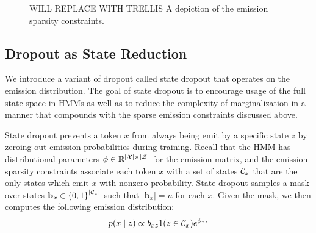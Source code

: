 \documentclass[11pt,a4paper]{article}
\begin{document}


\begin{figure}[t]
\begin{center}

\end{center}
\caption{
\label{fig:trellis}
{\color{red} WILL REPLACE WITH TRELLIS}
A depiction of the emission sparsity constraints.
}
\end{figure}

\subsection{Dropout as State Reduction}
We introduce a variant of dropout called state dropout that operates on the
emission distribution.
The goal of state dropout is to encourage usage of the full state space in HMMs
as well as to reduce the complexity of marginalization in a manner
that compounds with the sparse emission constraints discussed above.

State dropout prevents a token $x$ from always being emit by a specific state $z$
by zeroing out emission probabilities during training.
Recall that the HMM has distributional parameters
$\phi \in \mathbb{R}^{|\mathcal{X}|\times|\mathcal{Z}|}$ for the emission matrix,
and the emission sparsity constraints associate each token $x$
with a set of states $\mathcal{C}_x$ that are the only states which 
emit $x$ with nonzero probability.
State dropout samples a mask over states $\mathbf{b}_x \in \left\{0,1\right\}^{|\mathcal{C}_x|}$
such that $|\mathbf{b}_x| = n$ for each $x$.
Given the mask, we then computes the following emission distribution:
\begin{equation}
\label{eqn:state_dropout}
p(x \mid z) \propto b_{xz}1(z \in \mathcal{C}_x)e^{\phi_{xz}}
\end{equation}
\end{document}
